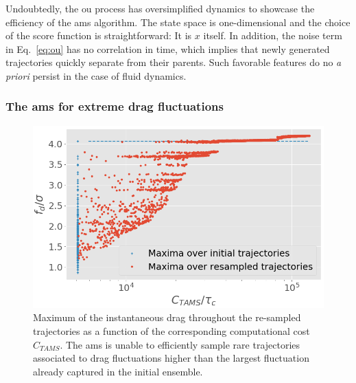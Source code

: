 \documentclass[pre,aps,floatfix,10pt,superscriptaddress, notitlepage,preprint]{revtex4-1}
\begin{document}
Undoubtedly, the \acl{ou} process has oversimplified dynamics to showcase the efficiency of the \ac{ams} algorithm.
The state space is one-dimensional and the choice of the score function is straightforward: It is $x$ itself.
In addition, the noise term in Eq.~\eqref{eq:ou} has no correlation in time, which implies that newly generated trajectories quickly separate from their parents. Such favorable features do no \textit{a priori} persist in the case of fluid dynamics.


\subsubsection{The \ac{ams} for extreme drag fluctuations}
\label{sec:ams_drag}

\begin{figure}
	\centering
	\includegraphics[width=.7\linewidth]{AMS_drag_resampling/AMS_drag_resampling.png}
	\caption{\label{fig:AMS_drag_resampling} Maximum of the instantaneous drag throughout the re-sampled trajectories as a function of the corresponding computational cost $C_{TAMS}$. The \ac{ams} is unable to efficiently sample rare trajectories associated to drag fluctuations higher than the largest fluctuation already captured in the initial ensemble.}
\end{figure}
\end{document}
